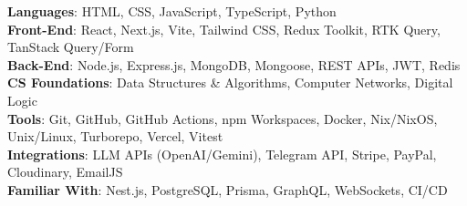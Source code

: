 \documentclass[letterpaper,11pt]{article}
\begin{document}
\begin{itemize}[leftmargin=0.15in, label={}]
    \small{
    \item{
        \textbf{Languages}{: HTML, CSS, JavaScript, TypeScript, Python} \\
        \textbf{Front-End}{: React, Next.js, Vite, Tailwind CSS,
        Redux Toolkit, RTK Query, TanStack Query/Form} \\
        \textbf{Back-End}{: Node.js, Express.js, MongoDB, Mongoose,
        REST APIs, JWT, Redis} \\
        \textbf{CS Foundations}{: Data Structures \& Algorithms,
        Computer Networks, Digital Logic} \\
        \textbf{Tools}{: Git, GitHub, GitHub Actions, npm Workspaces,
        Docker, Nix/NixOS, Unix/Linux, Turborepo, Vercel, Vitest} \\
        \textbf{Integrations}{: LLM APIs (OpenAI/Gemini), Telegram
        API, Stripe, PayPal, Cloudinary, EmailJS} \\
        \textbf{Familiar With}{: Nest.js, PostgreSQL, Prisma,
        GraphQL, WebSockets, CI/CD}
    }}
\end{itemize}

\end{document}
